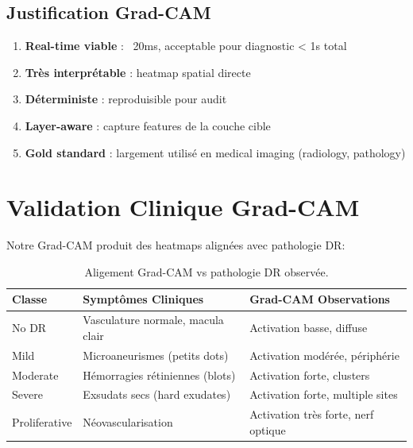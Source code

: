 \documentclass[12pt,a4paper,oneside]{report}
\begin{document}
\subsection{Justification Grad-CAM}

\begin{enumerate}
    \item \textbf{Real-time viable} : ~20ms, acceptable pour 
          diagnostic < 1s total
    \item \textbf{Très interprétable} : heatmap spatial directe
    \item \textbf{Déterministe} : reproduisible pour audit
    \item \textbf{Layer-aware} : capture features de la couche cible
    \item \textbf{Gold standard} : largement utilisé en medical imaging 
          (radiology, pathology)
\end{enumerate}

\section{Validation Clinique Grad-CAM}

Notre Grad-CAM produit des heatmaps alignées avec pathologie DR:

\begin{table}[H]
\centering
\begin{tabular}{|l|l|l|}
\hline
\textbf{Classe} & \textbf{Symptômes Cliniques} & 
\textbf{Grad-CAM Observations} \\
\hline
No DR & Vasculature normale, macula clair & Activation basse, 
diffuse \\
\hline
Mild & Microaneurismes (petits dots) & Activation modérée, 
périphérie \\
\hline
Moderate & Hémorragies rétiniennes (blots) & Activation forte, 
clusters \\
\hline
Severe & Exsudats secs (hard exudates) & Activation forte, 
multiple sites \\
\hline
Proliferative & Néovascularisation & Activation très forte, 
nerf optique \\
\hline
\end{tabular}
\caption{Aligement Grad-CAM vs pathologie DR observée.}
\label{tab:gradcam_clinical_alignment}
\end{table}

\newpage

\end{document}
